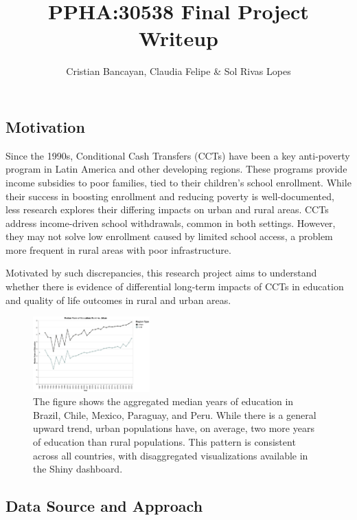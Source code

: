 \documentclass[
  10pt,
]{article}
\title{\large PPHA:30538 Final Project Writeup}
\author{\normalsize Cristian Bancayan, Claudia Felipe \& Sol Rivas
Lopes}
\date{}
\begin{document}
\maketitle


\subsection{Motivation}\label{motivation}

Since the 1990s, Conditional Cash Transfers (CCTs) have been a key
anti-poverty program in Latin America and other developing regions.
These programs provide income subsidies to poor families, tied to their
children's school enrollment. While their success in boosting enrollment
and reducing poverty is well-documented, less research explores their
differing impacts on urban and rural areas. CCTs address income-driven
school withdrawals, common in both settings. However, they may not solve
low enrollment caused by limited school access, a problem more frequent
in rural areas with poor infrastructure.

Motivated by such discrepancies, this research project aims to
understand whether there is evidence of differential long-term impacts
of CCTs in education and quality of life outcomes in rural and urban
areas.

\begin{figure}[H]

{\centering \includegraphics[width=0.4\textwidth,height=\textheight]{pictures/years_edu_all.png}

}

\caption{The figure shows the aggregated median years of education in
Brazil, Chile, Mexico, Paraguay, and Peru. While there is a general
upward trend, urban populations have, on average, two more years of
education than rural populations. This pattern is consistent across all
countries, with disaggregated visualizations available in the Shiny
dashboard.}

\end{figure}%

\subsection{Data Source and Approach}\label{data-source-and-approach}
\end{document}
